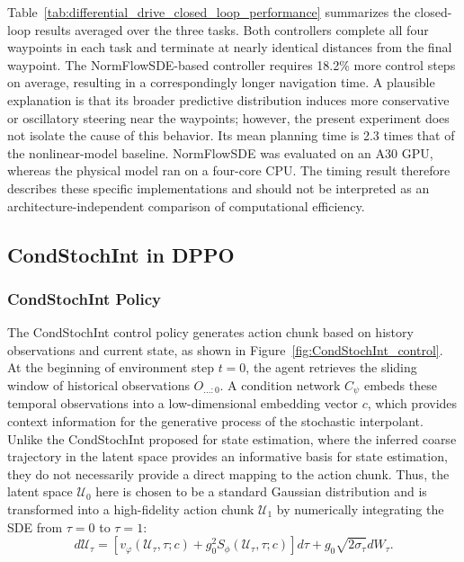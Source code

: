 Table~\ref{tab:differential_drive_closed_loop_performance} summarizes the closed-loop results averaged over the three tasks. Both controllers complete all four waypoints in each task and terminate at nearly identical distances from the final waypoint. The NormFlowSDE-based controller requires 18.2\% more control steps on average, resulting in a correspondingly longer navigation time. A plausible explanation is that its broader predictive distribution induces more conservative or oscillatory steering near the waypoints; however, the present experiment does not isolate the cause of this behavior. Its mean planning time is 2.3 times that of the nonlinear-model baseline. NormFlowSDE was evaluated on an A30 GPU, whereas the physical model ran on a four-core CPU. The timing result therefore describes these specific implementations and should not be interpreted as an architecture-independent comparison of computational efficiency.

\subsection{CondStochInt in DPPO}
\subsubsection{CondStochInt Policy}
The CondStochInt control policy generates action chunk based on history observations and current state, as shown in Figure~\ref{fig:CondStochInt_control}. At the beginning of environment step $t=0$, the agent retrieves the sliding window of historical observations $O_{...:0}$. A condition network $C_\psi$ embeds these temporal observations into a low-dimensional embedding vector $c$, which provides context information for the generative process of the stochastic interpolant. Unlike the CondStochInt proposed for state estimation, where the inferred coarse trajectory in the latent space provides an informative basis for state estimation, they do not necessarily provide a direct mapping to the action chunk. Thus, the latent space $\mathcal{U}_0$ here is chosen to be a standard Gaussian distribution and is transformed into a high-fidelity action chunk $\mathcal{U}_1$ by numerically integrating the \ac{SDE} from $\tau = 0$ to $\tau = 1$:
\begin{equation}
    d\mathcal{U}_\tau = \left[ v_\varphi(\mathcal{U}_\tau, \tau; c) + g_0^2 S_\phi(\mathcal{U}_\tau, \tau; c) \right] d\tau + g_0 \sqrt{2\sigma_\tau} dW_\tau.
\end{equation}

